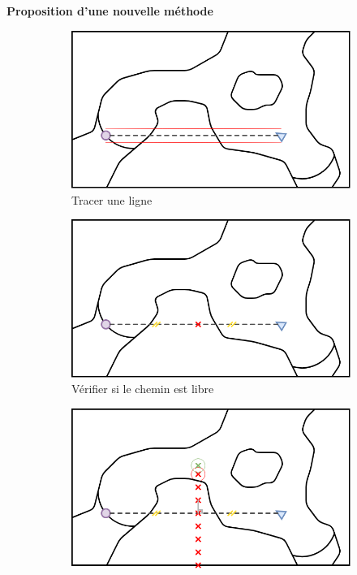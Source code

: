 \documentclass[aspectratio=169,10pt]{beamer}
\begin{document}
\begin{frame}{\textbf{Proposition d'une nouvelle méthode}}
	\begin{figure}[H]
		\centering
		\begin{subfigure}[b]{0.3\textwidth}
			\centering
			\includegraphics[width=\textwidth]{IMAGES/methode1.png}
			\caption{Tracer une ligne}
			\label{fig:draw_line}
		\end{subfigure}
		\hfill
		\begin{subfigure}[b]{0.3\textwidth}
			\centering
			\includegraphics[width=\textwidth]{IMAGES/methode2.png}
			\caption{Vérifier si le chemin est libre}
			\label{fig:check_line}
		\end{subfigure}
		\hfill
		\begin{subfigure}[b]{0.3\textwidth}
			\centering
			\includegraphics[width=\textwidth]{IMAGES/methode3.png}

\end{subfigure}
\end{figure}
\end{frame}
\end{document}
